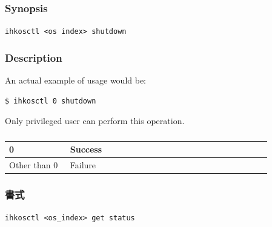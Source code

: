 \documentclass[twoside,11pt,fleqn]{book}
\begin{document}
\subsubsection{}
\subsubsection*{Synopsis}{\quad} \texttt{ihkosctl <os index> shutdown}
\subsubsection*{Description}{\quad}
An actual example of usage would be:

\begin{verbatim}
$ ihkosctl 0 shutdown
\end{verbatim}

Only privileged user can perform this operation.

\subsubsection*{}
\begin{table}[!h]
\footnotesize
\begin{tabular}{|p{0.20\linewidth}|p{0.66\linewidth}|} \hline
0&Success\\ \hline
Other than 0&Failure\\ \hline
\end{tabular}
\vspace{-0em}
\end{table}
\FloatBarrier

\subsubsection{}

\subsubsection*{書式}{\quad} \texttt{ihkosctl <os\_index> get status}
\end{document}
